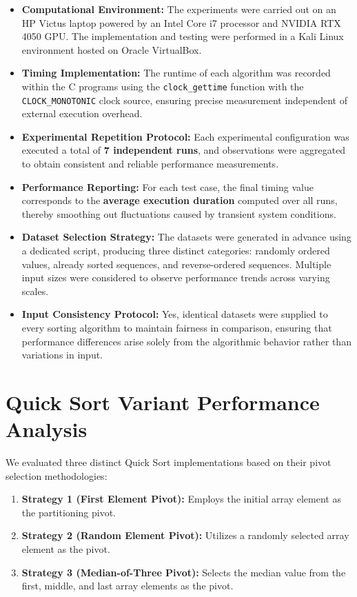 \documentclass[12pt,a4paper]{article}
\begin{document}
\begin{itemize}
    \item \textbf{Computational Environment:} The experiments were carried out on an HP Victus laptop powered by an Intel Core i7 processor and NVIDIA RTX 4050 GPU. The implementation and testing were performed in a Kali Linux environment hosted on Oracle VirtualBox.
    \item \textbf{Timing Implementation:} The runtime of each algorithm was recorded within the C programs using the \texttt{clock\_gettime} function with the \texttt{CLOCK\_MONOTONIC} clock source, ensuring precise measurement independent of external execution overhead.
    \item \textbf{Experimental Repetition Protocol:} Each experimental configuration was executed a total of \textbf{7 independent runs}, and observations were aggregated to obtain consistent and reliable performance measurements.
    \item \textbf{Performance Reporting:} For each test case, the final timing value corresponds to the \textbf{average execution duration} computed over all runs, thereby smoothing out fluctuations caused by transient system conditions.
    \item \textbf{Dataset Selection Strategy:} The datasets were generated in advance using a dedicated script, producing three distinct categories: randomly ordered values, already sorted sequences, and reverse-ordered sequences. Multiple input sizes were considered to observe performance trends across varying scales.
    \item \textbf{Input Consistency Protocol:} Yes, identical datasets were supplied to every sorting algorithm to maintain fairness in comparison, ensuring that performance differences arise solely from the algorithmic behavior rather than variations in input.
\end{itemize}

\section{Quick Sort Variant Performance Analysis}
We evaluated three distinct Quick Sort implementations based on their pivot selection methodologies:
\begin{enumerate}
    \item \textbf{Strategy 1 (First Element Pivot):} Employs the initial array element as the partitioning pivot.
    \item \textbf{Strategy 2 (Random Element Pivot):} Utilizes a randomly selected array element as the pivot.
    \item \textbf{Strategy 3 (Median-of-Three Pivot):} Selects the median value from the first, middle, and last array elements as the pivot.
\end{enumerate}
\end{document}
